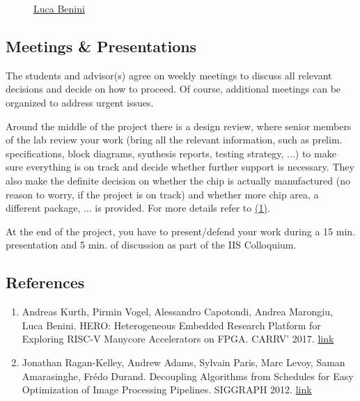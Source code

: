 \begin{description}
\item[]
\href{http://www.iis.ee.ethz.ch/portrait/staff/lbenini.en.html}{Luca
Benini}
\end{description}

\hypertarget{meetings_presentations}{%
\subsection{Meetings \& Presentations}\label{meetings_presentations}}

The students and advisor(s) agree on weekly meetings to discuss all
relevant decisions and decide on how to proceed. Of course, additional
meetings can be organized to address urgent issues.

Around the middle of the project there is a design review, where senior
members of the lab review your work (bring all the relevant information,
such as prelim. specifications, block diagrams, synthesis reports,
testing strategy, ...) to make sure everything is on track and decide
whether further support is necessary. They also make the definite
decision on whether the chip is actually manufactured (no reason to
worry, if the project is on track) and whether more chip area, a
different package, ... is provided. For more details refer to
\href{http://eda.ee.ethz.ch/index.php/Design_review}{(1)}.

At the end of the project, you have to present/defend your work during a
15 min. presentation and 5 min. of discussion as part of the IIS
Colloquium.

\hypertarget{references}{%
\subsection{References}\label{references}}

\begin{enumerate}
\item
  Andreas Kurth, Pirmin Vogel, Alessandro Capotondi, Andrea Marongiu,
  Luca Benini. HERO: Heterogeneous Embedded Research Platform for
  Exploring RISC-V Manycore Accelerators on FPGA. CARRV' 2017.
  \href{https://doi.org/10.3929/ethz-b-000219249}{link}
\item
  Jonathan Ragan-Kelley, Andrew Adams, Sylvain Paris, Marc Levoy, Saman
  Amarasinghe, Frédo Durand. Decoupling Algorithms from Schedules for
  Easy Optimization of Image Processing Pipelines. SIGGRAPH 2012.
  \href{http://people.csail.mit.edu/jrk/halide12}{link}
\end{enumerate}
